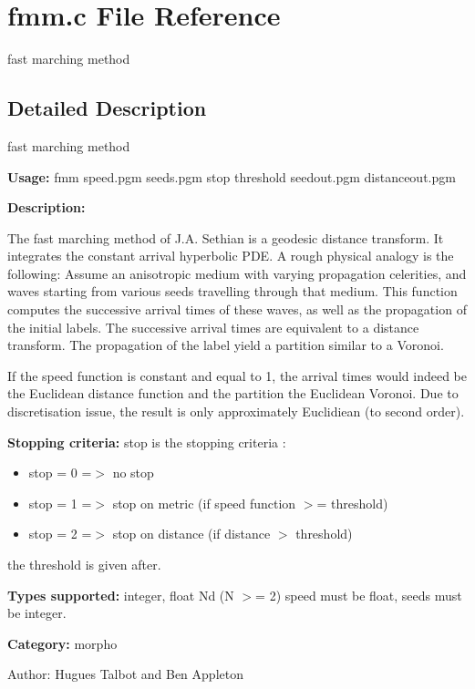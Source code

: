 \section{fmm.c File Reference}
\label{fmm_8c}
fast marching method  




\label{_details}
\subsection{Detailed Description}
fast marching method 

{\bf Usage:} fmm speed.pgm seeds.pgm stop threshold seedout.pgm distanceout.pgm

{\bf Description:}

The fast marching method of J.A. Sethian is a geodesic distance transform. It integrates the constant arrival hyperbolic PDE. A rough physical analogy is the following: Assume an anisotropic medium with varying propagation celerities, and waves starting from various seeds travelling through that medium. This function computes the successive arrival times of these waves, as well as the propagation of the initial labels. The successive arrival times are equivalent to a distance transform. The propagation of the label yield a partition similar to a Voronoi.

If the speed function is constant and equal to 1, the arrival times would indeed be the Euclidean distance function and the partition the Euclidean Voronoi. Due to discretisation issue, the result is only approximately Euclidiean (to second order).

{\bf Stopping criteria:} stop is the stopping criteria :

\begin{itemize}
\item stop = 0 =$>$ no stop \item stop = 1 =$>$ stop on metric (if speed function $>$= threshold) \item stop = 2 =$>$ stop on distance (if distance $>$ threshold)\end{itemize}
the threshold is given after.

{\bf Types supported:} integer, float Nd (N $>$= 2) speed must be float, seeds must be integer.

{\bf Category:} morpho

\begin{Desc}
\item[Author:]Hugues Talbot and Ben Appleton \end{Desc}
